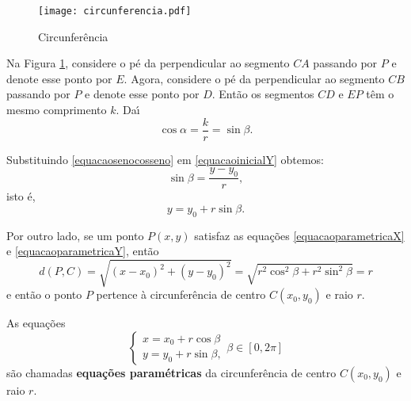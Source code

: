 \begin{figure}[h]
  \centering
  \caption{Circunfer\^encia}\label{circunferencia}
  \texttt{[image: circunferencia.pdf]}
\end{figure}

Na Figura \ref{circunferencia}, considere o p\'e da perpendicular ao segmento $CA$ passando por $P$ e denote esse ponto por $E$. Agora, considere o p\'e da perpendicular ao segmento $CB$ passando por $P$ e denote esse ponto por $D$. Ent\~ao os segmentos $CD$ e $EP$ t\^em o mesmo comprimento $k$. Da{\'\i}
\begin{equation}\label{equacaosenocosseno}
  \cos\alpha = \dfrac{k}{r} = \sin\beta.
\end{equation}

Substituindo \eqref{equacaosenocosseno} em \eqref{equacaoinicialY} obtemos:
\[
  \sin\beta = \dfrac{y - y_0}{r},
\]
isto \'e,
\begin{equation}\label{equacaoparametricaY}
   y = y_0 + r\sin\beta.
\end{equation}

Por outro lado, se um ponto $P(x, y)$ satisfaz as equa\c{c}\~oes \eqref{equacaoparametricaX} e \eqref{equacaoparametricaY}, ent\~ao
\[
  d(P,C) = \sqrt{(x - x_0)^2 + (y - y_0)^2} = \sqrt{r^2\cos^2\beta + r^2\sin^2\beta} = r
\]
e ent\~ao o ponto $P$ pertence \`a circunfer\^encia de centro $C(x_0,y_0)$ e raio $r$.

\begin{definicao}
  As equa\c{c}\~oes
  \[
    \begin{cases}
      x = x_0 + r\cos\beta\\
      y = y_0 + r\sin\beta,
    \end{cases}
    \beta \in [0,2\pi]
  \]
  s\~ao chamadas \textbf{equa\c{c}\~oes param\'etricas} da circunfer\^encia de centro $C(x_0, y_0)$ e raio $r$.
\end{definicao}

